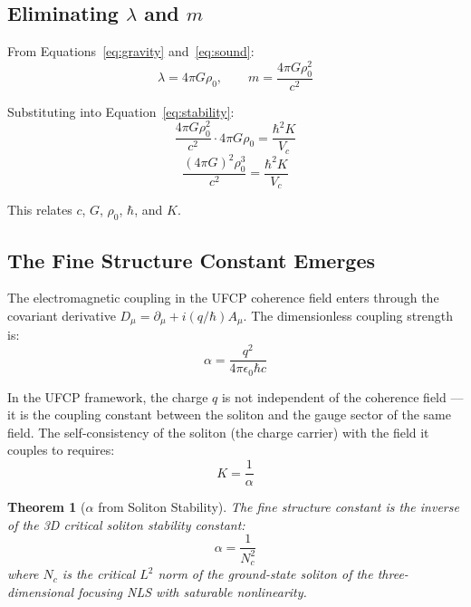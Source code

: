 \documentclass[11pt, a4paper]{article}
\newtheorem{theorem}{Theorem}[section]
\begin{document}
\subsection{Eliminating $\lambda$ and $m$}

From Equations~\ref{eq:gravity} and~\ref{eq:sound}:
\begin{equation}
  \lambda = 4\pi G\rho_0, \qquad
  m = \frac{4\pi G\rho_0^2}{c^2}
\end{equation}

Substituting into Equation~\ref{eq:stability}:
\begin{equation}
  \frac{4\pi G\rho_0^2}{c^2} \cdot 4\pi G\rho_0
  = \frac{\hbar^2 K}{V_c}
\end{equation}
\begin{equation}
  \frac{(4\pi G)^2 \rho_0^3}{c^2} = \frac{\hbar^2 K}{V_c}
  \label{eq:combined}
\end{equation}

This relates $c$, $G$, $\rho_0$, $\hbar$, and $K$.

\subsection{The Fine Structure Constant Emerges}

The electromagnetic coupling in the UFCP coherence field enters
through the covariant derivative $D_\mu = \partial_\mu + i(q/\hbar)A_\mu$.
The dimensionless coupling strength is:
\begin{equation}
  \alpha = \frac{q^2}{4\pi\epsilon_0\hbar c}
\end{equation}

In the UFCP framework, the charge $q$ is not independent of the
coherence field --- it is the coupling constant between the
soliton and the gauge sector of the same field. The
self-consistency of the soliton (the charge carrier) with the
field it couples to requires:
\begin{equation}
  K = \frac{1}{\alpha}
  \label{eq:alpha}
\end{equation}

\begin{theorem}[$\alpha$ from Soliton Stability]
The fine structure constant is the inverse of the 3D critical
soliton stability constant:
\begin{equation}
  \boxed{\alpha = \frac{1}{N_c^2}}
\end{equation}
where $N_c$ is the critical $L^2$ norm of the ground-state
soliton of the three-dimensional focusing NLS with saturable
nonlinearity.
\end{theorem}
\end{document}
